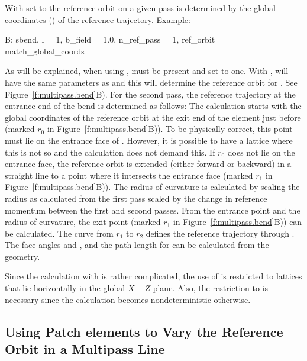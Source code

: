 With  set to  the reference
orbit on a given pass is determined by the global coordinates
() of the reference trajectory. Example:
\begin{example} 
  B: sbend, l = 1, b_field = 1.0, n_ref_pass = 1, ref_orbit = match_global_coords
\end{example}
As will be explained, when using ,
 must be present and set to one. With
,  will have the same parameters as
 and this will determine the reference orbit for . See
Figure~\ref{f:multipass.bend}B). For the second pass, the reference
trajectory at the entrance end of the bend is determined as follows:
The calculation starts with the global coordinates of the reference
orbit at the exit end of the element just before  (marked
$r_0$ in Figure~\ref{f:multipass.bend}B)). To be physically correct,
this point must lie on the entrance face of . However, it is
possible to have a lattice where this is not so and the calculation
does not demand this. If $r_0$ does not lie on the entrance face, the
reference orbit is extended (either forward or backward) in a straight
line to a point where it intersects the entrance face (marked $r_1$ in
Figure~\ref{f:multipass.bend}B)). The radius of curvature is
calculated by scaling the radius as calculated from the first pass
scaled by the change in reference momentum between the first and
second passes. From the entrance point and the radius of curvature,
the exit point (marked $r_1$ in Figure~\ref{f:multipass.bend}B)) can
be calculated. The curve from $r_1$ to $r_2$ defines the reference
trajectory through . The face angles  and , and
the path length  for  can be calculated from the
geometry.

Since the calculation with  is rather
complicated, the use of  is restricted to
lattices that lie horizontally in the global $X-Z$ plane. Also, the
restriction to  is necessary since the calculation
becomes nondeterministic otherwise. 

\subsection{Using Patch elements to Vary the Reference Orbit in a Multipass Line}
\label{s:multi.patch}

